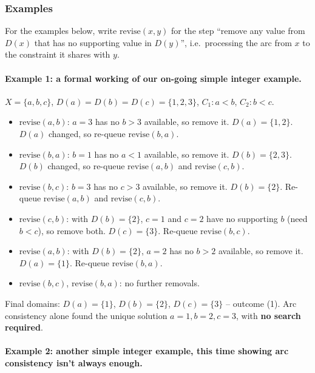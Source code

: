 \documentclass[11pt]{article}
\begin{document}
\subsubsection{Examples}

For the examples below, write $\mathrm{revise}(x,y)$ for the step ``remove any value from $D(x)$ that has no supporting value in $D(y)$'', i.e.\ processing the arc from $x$ to the constraint it shares with $y$.

\paragraph{Example 1: a formal working of our on-going simple integer example.}

$X=\{a,b,c\}$, $D(a)=D(b)=D(c)=\{1,2,3\}$, $C_1: a<b$, $C_2: b<c$.

\begin{itemize}
    \item $\mathrm{revise}(a,b)$: $a=3$ has no $b>3$ available, so remove it. $D(a)=\{1,2\}$. $D(a)$ changed, so re-queue $\mathrm{revise}(b,a)$.
    \item $\mathrm{revise}(b,a)$: $b=1$ has no $a<1$ available, so remove it. $D(b)=\{2,3\}$. $D(b)$ changed, so re-queue $\mathrm{revise}(a,b)$ and $\mathrm{revise}(c,b)$.
    \item $\mathrm{revise}(b,c)$: $b=3$ has no $c>3$ available, so remove it. $D(b)=\{2\}$. Re-queue $\mathrm{revise}(a,b)$ and $\mathrm{revise}(c,b)$.
    \item $\mathrm{revise}(c,b)$: with $D(b)=\{2\}$, $c=1$ and $c=2$ have no supporting $b$ (need $b<c$), so remove both. $D(c)=\{3\}$. Re-queue $\mathrm{revise}(b,c)$.
    \item $\mathrm{revise}(a,b)$: with $D(b)=\{2\}$, $a=2$ has no $b>2$ available, so remove it. $D(a)=\{1\}$. Re-queue $\mathrm{revise}(b,a)$.
    \item $\mathrm{revise}(b,c)$, $\mathrm{revise}(b,a)$: no further removals.
\end{itemize}

Final domains: $D(a)=\{1\}$, $D(b)=\{2\}$, $D(c)=\{3\}$ -- outcome (1). Arc consistency alone found the unique solution $a=1,b=2,c=3$, with \textbf{no search required}.

\paragraph{Example 2: another simple integer example, this time showing arc consistency isn't always enough.}
\end{document}
